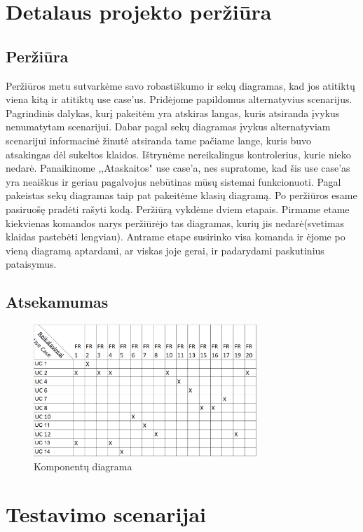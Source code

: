 \documentclass[oneside]{VUMIFPSkursinis}
\begin{document}
\section{Detalaus projekto peržiūra}
	\subsection{Peržiūra}
Peržiūros metu sutvarkėme savo robastiškumo ir sekų diagramas, kad jos atitiktų viena kitą ir atitiktų use case'us. Pridėjome papildomus alternatyvius scenarijus. Pagrindinis dalykas, kurį pakeitėm yra atskiras langas, kuris atsiranda įvykus nenumatytam scenarijui. Dabar pagal sekų diagramas įvykus alternatyviam scenarijui informacinė žinutė atsiranda tame pačiame lange, kuris buvo atsakingas dėl sukeltos klaidos.  Ištrynėme nereikalingus kontrolerius, kurie nieko nedarė. Panaikinome ,,Ataskaitos" use case'a, nes supratome, kad šis use case'as yra neaiškus ir geriau pagalvojus nebūtinas mūsų sistemai funkcionuoti. Pagal pakeistas sekų diagramas taip pat pakeitėme klasių diagramą. Po peržiūros esame pasiruošę pradėti rašyti kodą. Peržiūrą vykdėme dviem etapais. Pirmame etame kiekvienas komandos narys peržiūrėjo tas diagramas, kurių jis nedarė(svetimas klaidas pastebėti lengviau). Antrame etape susirinko visa komanda ir ėjome po vieną  diagramą aptardami, ar viskas joje gerai, ir padarydami paskutinius pataisymus.
	\subsection{Atsekamumas}
	
	\begin{figure}[h]
    				\centering
    				\includegraphics[width=0.75\textwidth]{UCxFR.png}
    				\caption{Komponentų diagrama}
    				\label{fig:Komponentų diagrama}
			\end{figure}
\section{Testavimo scenarijai}
	
\end{document}
